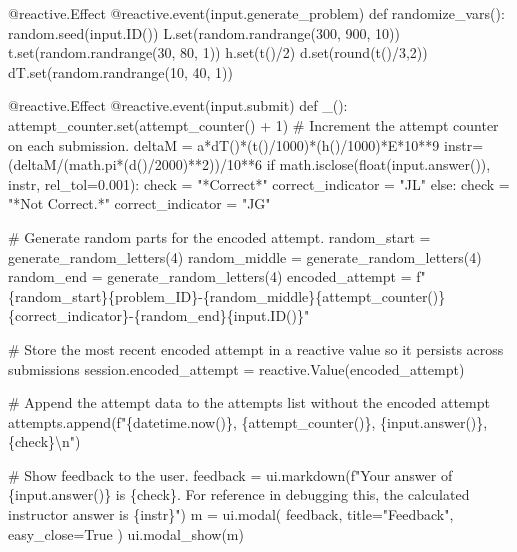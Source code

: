 \documentclass[
  letterpaper,
  DIV=11,
  numbers=noendperiod]{scrreprt}
\newenvironment{Shaded}{\begin{snugshade}}{\end{snugshade}}
\newcommand{\NormalTok}[1]{\textcolor[rgb]{0.00,0.23,0.31}{#1}}
\begin{document}
\begin{Shaded}
\begin{Highlighting}[]
\NormalTok{    @reactive.Effect}
\NormalTok{    @reactive.event(input.generate\_problem)}
\NormalTok{    def randomize\_vars():}
\NormalTok{        random.seed(input.ID())}
\NormalTok{        L.set(random.randrange(300, 900, 10))}
\NormalTok{        t.set(random.randrange(30, 80, 1))}
\NormalTok{        h.set(t()/2)}
\NormalTok{        d.set(round(t()/3,2))}
\NormalTok{        dT.set(random.randrange(10, 40, 1))}
        
\NormalTok{    @reactive.Effect}
\NormalTok{    @reactive.event(input.submit)}
\NormalTok{    def \_():}
\NormalTok{        attempt\_counter.set(attempt\_counter() + 1)  \# Increment the attempt counter on each submission.}
\NormalTok{        deltaM = a*dT()*(t()/1000)*(h()/1000)*E*10**9}
\NormalTok{        instr= (deltaM/(math.pi*(d()/2000)**2))/10**6}
\NormalTok{        if math.isclose(float(input.answer()), instr, rel\_tol=0.001):}
\NormalTok{            check = "*Correct*"}
\NormalTok{            correct\_indicator = "JL"}
\NormalTok{        else:}
\NormalTok{            check = "*Not Correct.*"}
\NormalTok{            correct\_indicator = "JG"}

\NormalTok{        \# Generate random parts for the encoded attempt.}
\NormalTok{        random\_start = generate\_random\_letters(4)}
\NormalTok{        random\_middle = generate\_random\_letters(4)}
\NormalTok{        random\_end = generate\_random\_letters(4)}
\NormalTok{        encoded\_attempt = f"\{random\_start\}\{problem\_ID\}{-}\{random\_middle\}\{attempt\_counter()\}\{correct\_indicator\}{-}\{random\_end\}\{input.ID()\}"}

\NormalTok{        \# Store the most recent encoded attempt in a reactive value so it persists across submissions}
\NormalTok{        session.encoded\_attempt = reactive.Value(encoded\_attempt)}

\NormalTok{        \# Append the attempt data to the attempts list without the encoded attempt}
\NormalTok{        attempts.append(f"\{datetime.now()\}, \{attempt\_counter()\}, \{input.answer()\}, \{check\}\textbackslash{}n")}

\NormalTok{        \# Show feedback to the user.}
\NormalTok{        feedback = ui.markdown(f"Your answer of \{input.answer()\} is \{check\}. For reference in debugging this, the calculated instructor answer is \{instr\}")}
\NormalTok{        m = ui.modal(}
\NormalTok{            feedback,}
\NormalTok{            title="Feedback",}
\NormalTok{            easy\_close=True}
\NormalTok{        )}
\NormalTok{        ui.modal\_show(m)}


\end{Highlighting}
\end{Shaded}
\end{document}
